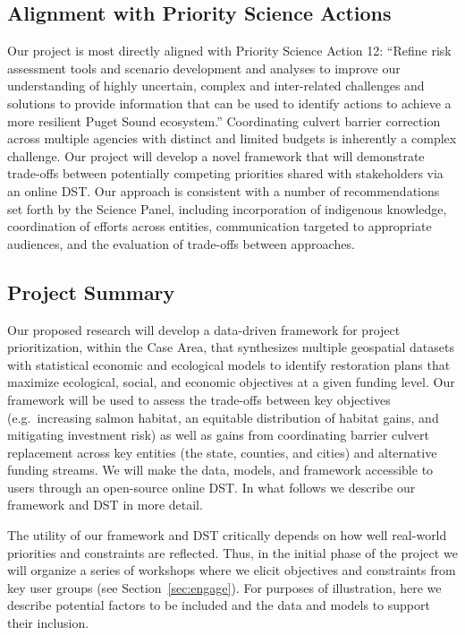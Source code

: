\documentclass[12pt]{elsarticle}
\begin{document}
	\subsection{Alignment with Priority Science Actions} %
	
	Our project is most directly aligned with Priority Science Action 12: ``Refine risk assessment tools and scenario development and analyses to improve our understanding of highly uncertain, complex and inter-related challenges and solutions to provide information that can be used to identify actions to achieve a more resilient Puget Sound ecosystem.'' Coordinating culvert barrier correction across multiple agencies with distinct and limited budgets is inherently a complex challenge. Our project will develop a novel framework that will demonstrate trade-offs between potentially competing priorities shared with stakeholders via an online DST. Our approach is consistent with a number of recommendations set forth by the Science Panel, including incorporation of indigenous knowledge, coordination of efforts across entities, communication targeted to appropriate audiences, and the evaluation of trade-offs between approaches.
	
	\subsection{Project Summary}\label{sec:summary} %
	
	Our proposed research will develop a data-driven framework for project prioritization, within the Case Area, that synthesizes multiple geospatial datasets with statistical economic and ecological models to identify restoration plans that maximize ecological, social, and economic objectives at a given funding level. Our framework will be used to assess the trade-offs between key objectives (e.g.\ increasing salmon habitat, an equitable distribution of habitat gains, and mitigating investment risk) as well as gains from coordinating barrier culvert replacement across key entities (the state, counties, and cities) and alternative funding streams. We will make the data, models, and framework accessible to users through an open-source online DST. In what follows we describe our framework and DST in more detail.
	
	The utility of our framework and DST critically depends on how well real-world priorities and constraints are reflected. Thus, in the initial phase of the project we will organize a series of workshops where we elicit objectives and constraints from key user groups (see Section~\ref{sec:engage}). For purposes of illustration, here we describe potential factors to be included and the data and models to support their inclusion.   
	
\end{document}
